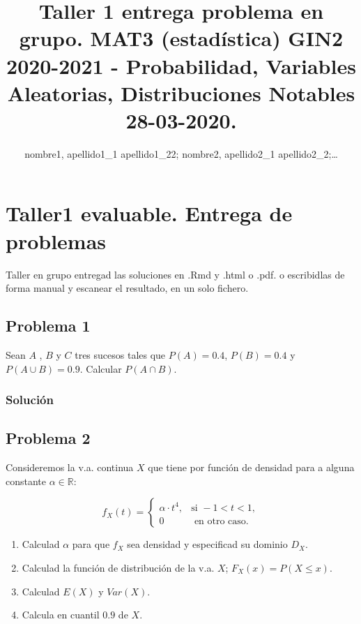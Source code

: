 \documentclass[
]{article}
\title{Taller 1 entrega problema en grupo. MAT3 (estadística) GIN2
2020-2021 - Probabilidad, Variables Aleatorias, Distribuciones Notables
28-03-2020.}
\author{nombre1, apellido1\_1 apellido1\_22; nombre2, apellido2\_1
apellido2\_2;\ldots{}}
\date{}
\providecommand{\tightlist}{%
  \setlength{\itemsep}{0pt}\setlength{\parskip}{0pt}}
\begin{document}
\maketitle

\hypertarget{taller1-evaluable.-entrega-de-problemas}{%
\section{Taller1 evaluable. Entrega de
problemas}\label{taller1-evaluable.-entrega-de-problemas}}

Taller en grupo entregad las soluciones en .Rmd y .html o .pdf. o
escribidlas de forma manual y escanear el resultado, en un solo fichero.

\hypertarget{problema-1}{%
\subsection{Problema 1}\label{problema-1}}

Sean \(A\) , \(B\) y \(C\) tres sucesos tales que \(P(A)=0.4\),
\(P(B)=0.4\) y \(P(A\cup B)=0.9\). Calcular \(P(A\cap B)\).

\hypertarget{soluciuxf3n}{%
\subsubsection{Solución}\label{soluciuxf3n}}

\hypertarget{problema-2}{%
\subsection{Problema 2}\label{problema-2}}

Consideremos la v.a. continua \(X\) que tiene por función de densidad
para a alguna constante \(\alpha\in \mathbb{R}\):

\[
f_X (t)=
\left\{\begin{array}{ll}
\alpha \cdot t^4, & \mbox{si } -1 < t <1,
 \\
0 & \mbox{ en otro caso}.
\end{array}\right.
\]

\begin{enumerate}
\def\labelenumi{\arabic{enumi}.}
\tightlist
\item
  Calculad \(\alpha\) para que \(f_X\) sea densidad y especificad su
  dominio \(D_X\).
\item
  Calculad la función de distribución de la v.a. \(X\);
  \(F_X(x)=P(X\leq x)\).
\item
  Calculad \(E(X)\) y \(Var(X)\).
\item
  Calcula en cuantil \(0.9\) de \(X\).
\end{enumerate}
\end{document}
